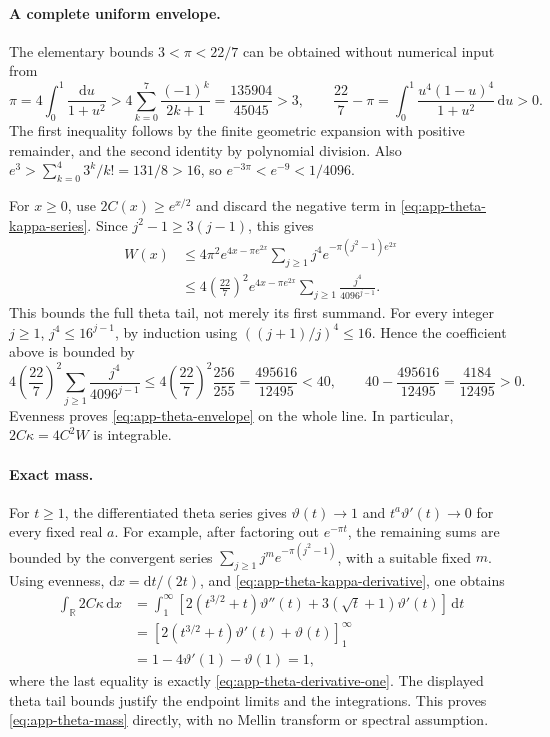 \paragraph{A complete uniform envelope.}
The elementary bounds $3<\pi<22/7$ can be obtained without numerical
input from
\[
 \pi=4\int_0^1\frac{\mathrm du}{1+u^2}
 >4\sum_{k=0}^7\frac{(-1)^k}{2k+1}
 =\frac{135904}{45045}>3,
 \qquad
 \frac{22}{7}-\pi
 =\int_0^1\frac{u^4(1-u)^4}{1+u^2}\,\mathrm du>0.
\]
The first inequality follows by the finite geometric expansion with
positive remainder, and the second identity by polynomial division.
Also $e^3>\sum_{k=0}^4 3^k/k!=131/8>16$, so
$e^{-3\pi}<e^{-9}<1/4096$.

For $x\ge0$, use $2C(x)\ge e^{x/2}$ and discard the negative term in
\eqref{eq:app-theta-kappa-series}.  Since
$j^2-1\ge3(j-1)$, this gives
\begin{align*}
 W(x)
 &\le4\pi^2e^{4x-\pi e^{2x}}
           \sum_{j\ge1}j^4e^{-\pi(j^2-1)e^{2x}}\\
 &\le4\left(\frac{22}{7}\right)^2e^{4x-\pi e^{2x}}
           \sum_{j\ge1}\frac{j^4}{4096^{j-1}}.
\end{align*}
This bounds the full theta tail, not merely its first summand.
For every integer $j\ge1$, $j^4\le16^{j-1}$, by induction using
$((j+1)/j)^4\le16$.  Hence the coefficient above is bounded by
\[
 4\left(\frac{22}{7}\right)^2
   \sum_{j\ge1}\frac{j^4}{4096^{j-1}}
 \le4\left(\frac{22}{7}\right)^2\frac{256}{255}
 =\frac{495616}{12495}<40,
 \qquad 40-\frac{495616}{12495}=\frac{4184}{12495}>0.
\]
Evenness proves \eqref{eq:app-theta-envelope} on the whole line.  In
particular, $2C\kappa=4C^2W$ is integrable.

\paragraph{Exact mass.}
For $t\ge1$, the differentiated theta series gives
$\vartheta(t)\to1$ and $t^a\vartheta'(t)\to0$ for every fixed real $a$.
For example, after factoring out $e^{-\pi t}$, the remaining sums are
bounded by the convergent series
$\sum_{j\ge1}j^m e^{-\pi(j^2-1)}$, with a suitable fixed $m$.
Using evenness, $\mathrm dx=\mathrm dt/(2t)$, and
\eqref{eq:app-theta-kappa-derivative}, one obtains
\begin{align*}
 \int_{\mathbb R}2C\kappa\,\mathrm dx
 &=\int_1^\infty
    \left[2(t^{3/2}+t)\vartheta''(t)
                +3(\sqrt t+1)\vartheta'(t)\right]\,\mathrm dt\\
 &=\left[2(t^{3/2}+t)\vartheta'(t)+\vartheta(t)\right]_1^\infty\\
 &=1-4\vartheta'(1)-\vartheta(1)=1,
\end{align*}
where the last equality is exactly
\eqref{eq:app-theta-derivative-one}.  The displayed theta tail bounds
justify the endpoint limits and the integrations.  This proves
\eqref{eq:app-theta-mass} directly, with no Mellin transform or
spectral assumption.
